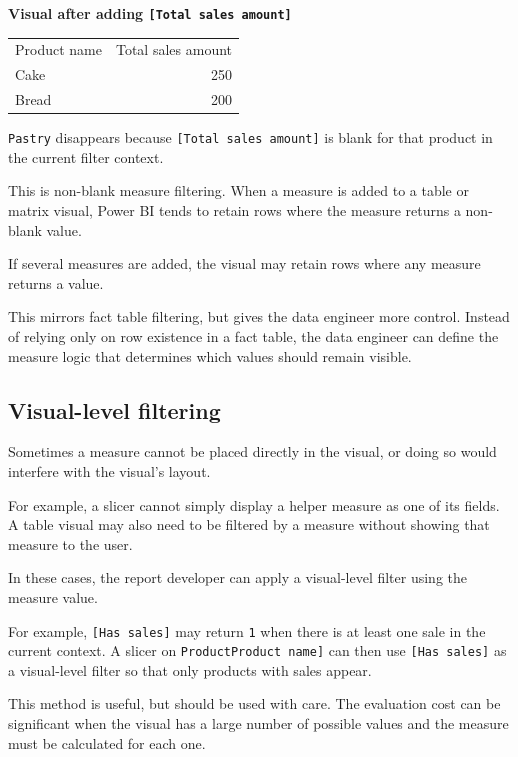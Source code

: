 \documentclass[10pt,openany,10pt]{book}
\newcounter{none}
\let\podeToprule\toprule
\let\podeMidrule\midrule
\let\podeBottomrule\bottomrule
\renewcommand{\toprule}{\arrayrulecolor{pbiGrid}\podeToprule}
\renewcommand{\midrule}{\arrayrulecolor{pbiGrid}\podeMidrule}
\renewcommand{\bottomrule}{\arrayrulecolor{pbiGrid}\podeBottomrule}
\begin{document}
\textbf{Visual after adding \texttt{{[}Total\ sales\ amount{]}}}

{\def\LTcaptype{none} %
\begin{longtable}[]{@{}lr@{}}
\toprule\noalign{}
Product name & Total sales amount \\
\midrule\noalign{}
\endhead
\bottomrule\noalign{}
\endlastfoot
Cake & 250 \\
Bread & 200 \\
\end{longtable}
}

\texttt{Pastry} disappears because \texttt{{[}Total\ sales\ amount{]}}
is blank for that product in the current filter context.

This is non-blank measure filtering. When a measure is added to a table
or matrix visual, Power BI tends to retain rows where the measure
returns a non-blank value.

If several measures are added, the visual may retain rows where any
measure returns a value.

This mirrors fact table filtering, but gives the data engineer more
control. Instead of relying only on row existence in a fact table, the
data engineer can define the measure logic that determines which values
should remain visible.

\subsection{Visual-level filtering}\label{visual-level-filtering}

Sometimes a measure cannot be placed directly in the visual, or doing so
would interfere with the visual's layout.

For example, a slicer cannot simply display a helper measure as one of
its fields. A table visual may also need to be filtered by a measure
without showing that measure to the user.

In these cases, the report developer can apply a visual-level filter
using the measure value.

For example, \texttt{{[}Has\ sales{]}} may return \texttt{1} when there
is at least one sale in the current context. A slicer on
\texttt{\textquotesingle{}Product\textquotesingle{}{[}Product\ name{]}}
can then use \texttt{{[}Has\ sales{]}} as a visual-level filter so that
only products with sales appear.

This method is useful, but should be used with care. The evaluation cost
can be significant when the visual has a large number of possible values
and the measure must be calculated for each one.
\end{document}
